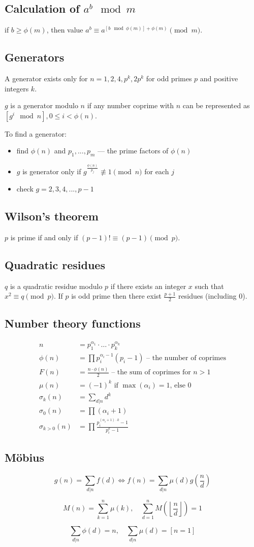 \subsection*{Calculation of $a^b \mod m$}
if $b \ge \phi(m)$, then value $a^b \equiv a^{\left[b \mod \phi(m)\right] + \phi(m)} \pmod m$.

\subsection*{Generators}
A generator exists only for $n = 1, 2, 4, p^k, 2p^k$ for odd primes $p$ and positive integers $k$. 

$g$ is a generator modulo $n$ if any number coprime with $n$ can be represented as $\left[ g^i \mod n \right], 0 \le i < \phi(n)$.

To find a generator:
\begin{itemize}
\item find $\phi(n)$ and $p_1, ..., p_m$ --- the prime factors of $\phi(n)$
\item $g$ is generator only if $g^{\frac{\phi(n)}{p_j}} \not\equiv 1 \pmod n$ for each $j$
\item check $g = 2, 3, 4, ..., p - 1$
\end{itemize}

\subsection*{Wilson's theorem}
$p$ is prime if and only if $(p - 1)! \equiv (p - 1) \pmod p$.

\subsection*{Quadratic residues}
$q$ is a quadratic residue modulo $p$ if there exists an integer $x$ such that $x^2 \equiv q \pmod p$.
If $p$ is odd prime then there exist $\frac{p + 1}{2}$ residues (including 0).

\subsection*{Number theory functions}
\begin{align*}
n &= p_1^{\alpha_1} \cdot \dots \cdot p_k^{\alpha_k}\\
\phi(n) &= \prod p_i^{\alpha_i - 1} (p_i - 1) \text{ – the number of coprimes}\\
F(n) &= \frac{n \cdot \phi(n)}{2} \text{ – the sum of coprimes for } n > 1\\
\mu(n) &= (-1)^k \text{ if } \max(\alpha_i) = 1 \text {, else } 0\\
\sigma_k(n) &= \sum_{d|n} d^k\\
\sigma_0(n) &= \prod (\alpha_i + 1)\\
\sigma_{k > 0}(n) &= \prod \frac{p_i^{(\alpha_i + 1) \cdot k} - 1}{p_i^k - 1} 
\end{align*}

\subsection*{Möbius}
$$g(n) = \sum_{d|n}f(d) \iff f(n) = \sum_{d|n}\mu(d)g\left(\frac{n}{d}\right)$$

$$M(n) = \sum_{k=1}^{n}\mu(k), \quad \sum_{d = 1}^{n} M\left(\left\lfloor\frac{n}{d}\right\rfloor\right) = 1$$

$$\sum_{d|n} \phi(d) = n, \quad \sum_{d|n} \mu(d) = [n = 1]$$